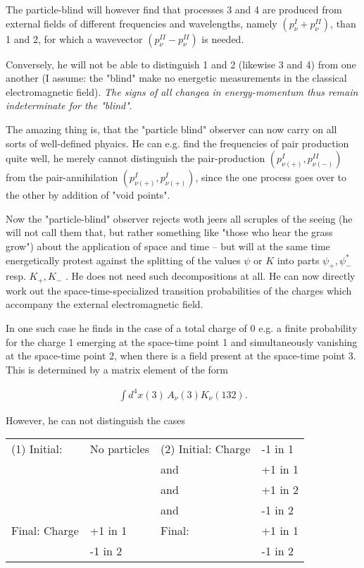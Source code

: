 \documentclass{article}
\newcommand{\uequ}[1]{
\begin{align*}
#1
\end{align*}
}
\begin{document}
The particle-blind will however find that processes 3 and 4 are produced from external fields of different frequencies and wavelengths, namely $(p_\nu^I + p_\nu^{II})$, than 1 and 2, for which a wavevector $(p^{II}_\nu - p^{II}_\nu)$ is needed.

Conversely, he will not be able to distinguish 1 and 2 (likewise 3 and 4) from one another (I assume: the "blind" make no energetic measurements in the classical electromagnetic field). \textit{The signs of all changea in energy-momentum thus remain indeterminate for the "blind"}.

The amazing thing is, that the "particle blind" observer can now carry on all sorts of well-defined phyaics. He can e.g. find the frequencies of pair production quite well, he merely cannot distinguish the pair-production $\left(p_{\nu(+)}^{I}, p_{\nu(-)}^{II}\right)$ from the pair-annihilation $\left(p_{\nu(+)}^{I}, p_{\nu(+)}^{I}\right)$, since the one process goes over to the other by addition of "void points".

Now the "particle-blind" observer rejects woth jeers all scruples of the seeing (he will not call them that, but rather something like "those who hear the grass grow") about the application of space and time  -- but will at the same time energetically protest against the splitting of the values $\psi$ or $K$ into parts $\psi_+,\psi^*_-$ resp. $K_+,K_-$ . He does not need such decompositions at all. He can now directly work out the space-time-specialized transition probabilities of the charges which accompany the external electromagnetic field.

In one such case he finds in the case of a total charge of 0 e.g. a finite probability for the charge 1 emerging at the space-time point 1 and simultaneously vanishing at the space-time point 2, when there is a field present at the space-time point 3. This is determined by a matrix element of the form
\uequ{
\int{d^4 x(3)}\,A_\nu(3) K_\nu(132).
}
However, he can not distinguish the cases

\begin{tabular}{ll|ll}
(1) Initial: & No particles & (2) Initial: Charge & -1 in 1 \\
             &              &  and                & +1 in 1 \\
             &              &  and                & +1 in 2 \\
             &              &  and                & -1 in 2 \\
\hline
Final: Charge &        +1 in 1 & Final:            & +1 in 1 \\
              &        -1 in 2 &                   & -1 in 2
\end{tabular}
\end{document}
